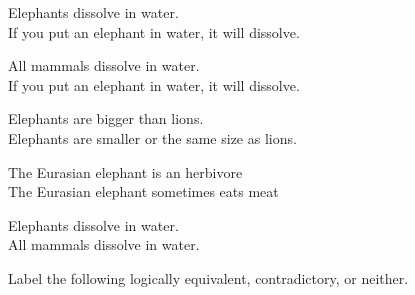  
\begin{exercises}
\item Elephants dissolve in water.	\\
	If you put an elephant in water, it will dissolve.

\item All mammals dissolve in water.\\		
	If you put an elephant in water, it will dissolve. 

\item Elephants are bigger than lions. \\                                                                                        
Elephants are smaller or the same size as lions.

\item The Eurasian elephant is an herbivore \\
The Eurasian elephant sometimes eats meat

\item Elephants dissolve in water. 	\\	
	All mammals dissolve in water. 

\end{exercises}

\noindent \problempart Label the following logically equivalent, contradictory, or neither. 

